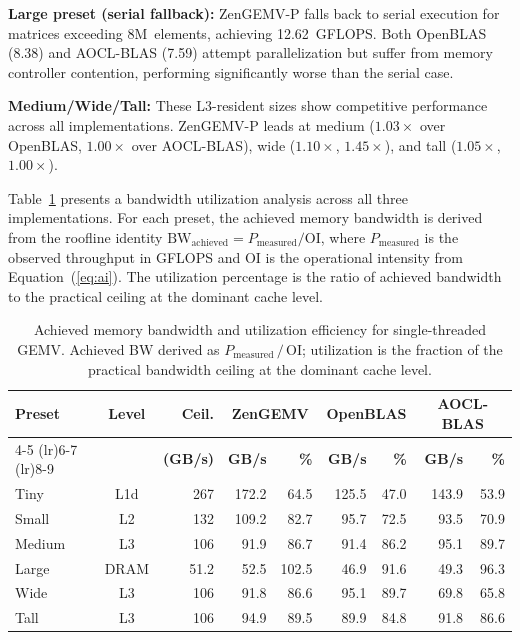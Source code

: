 \documentclass[runningheads]{llncs}
\begin{document}
\textbf{Large preset (serial fallback):} ZenGEMV-P falls back to
serial execution for matrices exceeding $8\text{M}$~elements, achieving
12.62~GFLOPS. Both OpenBLAS (8.38) and AOCL-BLAS (7.59) attempt parallelization
but suffer from memory controller contention, performing significantly worse
than the serial case.

\textbf{Medium/Wide/Tall:} These L3-resident sizes show competitive performance
across all implementations. ZenGEMV-P leads at medium ($1.03\times$ over OpenBLAS,
$1.00\times$ over AOCL-BLAS), wide ($1.10\times$, $1.45\times$), and tall
($1.05\times$, $1.00\times$).


Table~\ref{tab:bw_util} presents a bandwidth utilization analysis across all
three implementations. For each preset, the achieved memory bandwidth is
derived from the roofline identity $\text{BW}_{\text{achieved}} =
P_{\text{measured}} / \text{OI}$, where $P_{\text{measured}}$ is the observed
throughput in GFLOPS and OI is the operational intensity from
Equation~(\ref{eq:ai}). The utilization percentage is the ratio of achieved
bandwidth to the practical ceiling at the dominant cache level.

\begin{table}[t]
\centering
\caption{Achieved memory bandwidth and utilization efficiency for
single-threaded GEMV. Achieved BW derived as
$P_{\text{measured}}\,/\,$OI; utilization is the fraction of the
practical bandwidth ceiling at the dominant cache level.}
\label{tab:bw_util}
\begin{tabular}{@{}l c r rr rr rr@{}}
\toprule
\textbf{Preset} & \textbf{Level} & \textbf{Ceil.} &
  \multicolumn{2}{c}{\textbf{ZenGEMV}} &
  \multicolumn{2}{c}{\textbf{OpenBLAS}} &
  \multicolumn{2}{c}{\textbf{AOCL-BLAS}} \\
\cmidrule(lr){4-5} \cmidrule(lr){6-7} \cmidrule(lr){8-9}
 & & \textbf{(GB/s)} &
  \textbf{GB/s} & \textbf{\%} &
  \textbf{GB/s} & \textbf{\%} &
  \textbf{GB/s} & \textbf{\%} \\
\midrule
Tiny   & L1d  & 267  & 172.2 & 64.5 & 125.5 & 47.0 & 143.9 & 53.9 \\
Small  & L2   & 132  & 109.2 & 82.7 &  95.7 & 72.5 &  93.5 & 70.9 \\
Medium & L3   & 106  &  91.9 & 86.7 &  91.4 & 86.2 &  95.1 & 89.7 \\
Large  & DRAM & 51.2 &  52.5 & 102.5 & 46.9 & 91.6 &  49.3 & 96.3 \\
Wide   & L3   & 106  &  91.8 & 86.6 &  95.1 & 89.7 &  69.8 & 65.8 \\
Tall   & L3   & 106  &  94.9 & 89.5 &  89.9 & 84.8 &  91.8 & 86.6 \\
\bottomrule
\end{tabular}
\end{table}
\end{document}
